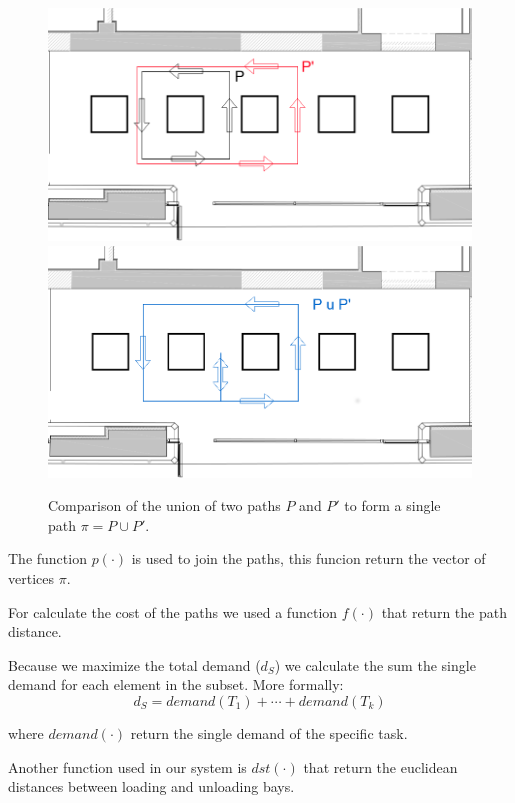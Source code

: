 \begin{figure}[hbt]
    \begin{multicols}{2}
        \includegraphics[width=\linewidth]{img/p1p2_cut.png}
        \includegraphics[width=\linewidth]{img/p3_cut.png}
    \end{multicols}
    \caption{Comparison of the union of two paths $P$ and $P'$ to form a single path $\pi = P \cup P'$.}
\end{figure}


The function $p(\cdot)$ is used to join the paths, this funcion return the vector of vertices $\pi$. 

For calculate the cost of the paths we used a function $f(\cdot)$ that return the path distance.

Because we maximize the total demand ($d_S$) we calculate the sum the single demand for each element in the subset.
More formally:
\[d_S =demand(T_1) + \cdots + demand(T_k)\]

where $demand(\cdot)$ return the single demand of the specific task.

Another function used in our system is $dst(\cdot)$ that return the euclidean distances between loading and unloading bays.

